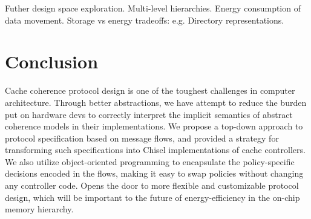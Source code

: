Futher design space exploration.
Multi-level hierarchies.
Energy consumption of data movement.
Storage vs energy tradeoffs: e.g. Directory representations.

\section{Conclusion}

Cache coherence protocol design is one of the toughest challenges in computer architecture.
Through better abstractions, we have attempt to reduce the burden put on hardware devs
to correctly interpret the implicit semantics of abstract coherence models in their implementations.
We propose a top-down approach to protocol specification based on message flows, and provided a strategy
for transforming such specifications into Chisel implementations of cache controllers.
We also utilize object-oriented programming to encapsulate the policy-specific decisions encoded
in the flows, making it easy to swap policies without changing any controller code.
Opens the door to more flexible and customizable protocol design, which will be important
to the future of energy-efficiency in the on-chip memory hierarchy.

